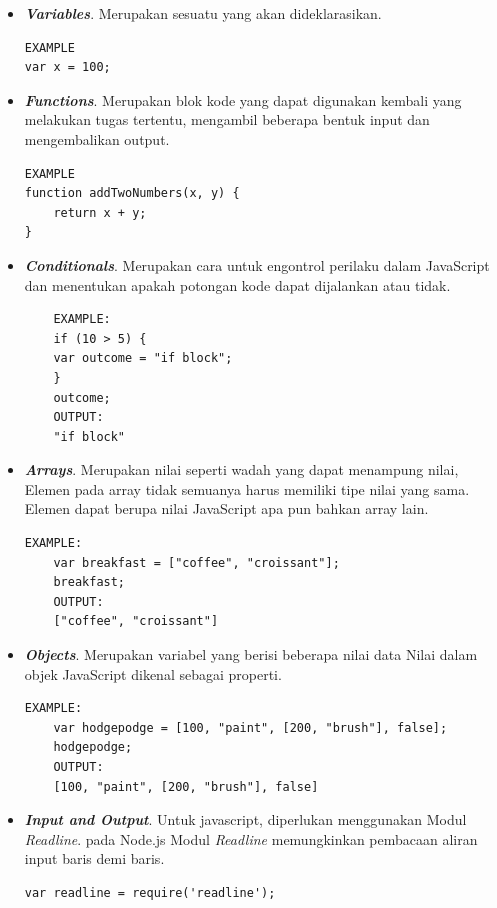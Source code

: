 \documentclass[a4paper,twoside]{article}
\begin{document}
\begin{enumerate}
\begin{itemize}
		    \item \textbf{\textit{Variables}}. Merupakan sesuatu yang akan dideklarasikan.
		    \begin{verbatim}
EXAMPLE
var x = 100;		        
		    \end{verbatim}
		    \vspace{-5mm}
		    \item \textbf{\textit{Functions}}. Merupakan  blok kode yang dapat digunakan kembali yang melakukan tugas tertentu, mengambil beberapa bentuk input dan mengembalikan output.
		    \begin{verbatim}
EXAMPLE
function addTwoNumbers(x, y) {
    return x + y;
}		        
		    \end{verbatim}
		    \vspace{-5mm}
		    \item \textbf{\textit{Conditionals}}. Merupakan cara untuk engontrol perilaku dalam JavaScript dan menentukan apakah potongan kode dapat dijalankan atau tidak.
		    \begin{verbatim}
    EXAMPLE:
    if (10 > 5) {
    var outcome = "if block";
    }
    outcome;
    OUTPUT:
    "if block"		        
		    \end{verbatim}
		    \vspace{-2mm}		    
		    \item \textbf{\textit{Arrays}}. Merupakan nilai seperti wadah yang dapat menampung nilai, Elemen pada array tidak semuanya harus memiliki tipe nilai yang sama. Elemen dapat berupa nilai JavaScript apa pun bahkan array lain.
		    \begin{verbatim}
EXAMPLE:
    var breakfast = ["coffee", "croissant"];
    breakfast;
    OUTPUT:
    ["coffee", "croissant"]			        
		    \end{verbatim}
		    \vspace{-2mm}
	    
		    \item \textbf{\textit{Objects}}. Merupakan variabel yang berisi beberapa nilai data Nilai dalam objek JavaScript dikenal sebagai properti. 
		    \begin{verbatim}
EXAMPLE:
    var hodgepodge = [100, "paint", [200, "brush"], false];
    hodgepodge;
    OUTPUT:
    [100, "paint", [200, "brush"], false]		        
		    \end{verbatim}
		    \vspace{-2mm}
		    
		    \item \textbf{\textit{Input and Output}}. Untuk javascript, diperlukan menggunakan Modul \textit{Readline}. pada Node.js Modul \textit{Readline} memungkinkan pembacaan aliran input baris demi baris.
		    \begin{verbatim}
var readline = require('readline');
		    \end{verbatim}
		    \vspace{-2mm}
		    

\end{itemize}
\end{enumerate}
\end{document}
